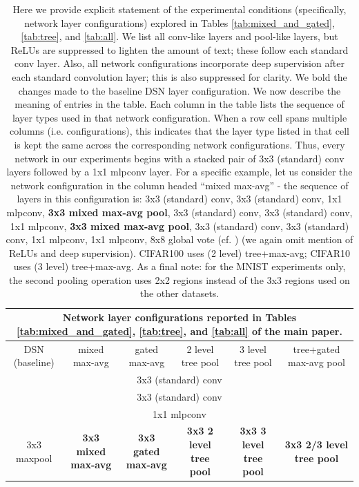 \documentclass[twoside]{article}
\begin{document}
\begin{table}[ht]
\vspace{-20mm}
\begin{centering}
{ \caption{\label{tab:network_configurations} Here we provide explicit statement of the experimental
conditions (specifically, network layer configurations) explored in
Tables \ref{tab:mixed_and_gated}, \ref{tab:tree}, and 
\ref{tab:all}. We list all conv-like layers and pool-like layers,
but ReLUs are suppressed to lighten the amount of text; these follow
each standard conv layer. Also, all network configurations incorporate
deep supervision after each standard convolution layer; this is also
suppressed for clarity.  We bold the changes made to the baseline
DSN layer configuration. We now describe the meaning of
entries in the table. Each column in the table lists the sequence
of layer types used in that network configuration. When a row cell
spans multiple columns (i.e. configurations), this indicates that
the layer type listed in that cell is kept the same across the corresponding
network configurations. Thus, every network in our experiments begins
with a stacked pair of 3x3 (standard) conv layers followed by a 1x1
mlpconv layer. For a specific example, let us consider the network
configuration in the column headed ``mixed max-avg'' - the sequence
of layers in this configuration is: 3x3 (standard) conv, 3x3 (standard)
conv, 1x1 mlpconv, \textbf{3x3 mixed max-avg pool},
3x3 (standard) conv, 3x3 (standard) conv, 1x1 mlpconv, \textbf{3x3
mixed max-avg pool}, 3x3 (standard) conv, 3x3 (standard)
conv, 1x1 mlpconv, 1x1 mlpconv, 8x8 global vote (cf. \cite{lin2013network}) (we again 
omit mention of ReLUs and deep supervision). CIFAR100 uses (2 level) tree+max-avg; CIFAR10 uses (3 level) 
tree+max-avg. As a final note: for the MNIST experiments only, the second pooling operation 
uses 2x2 regions instead of the 3x3 regions used on the other datasets.}
}
{\scriptsize
\begin{tabular}{c|c|c|c|c|c}
\hline 
\multicolumn{6}{c}{Network layer configurations reported in Tables \ref{tab:mixed_and_gated}, \ref{tab:tree}, and 
\ref{tab:all} of the main paper.}\tabularnewline
\hline 
DSN (baseline) & mixed max-avg & gated max-avg & 2 level tree pool & 3 level tree pool & tree+gated max-avg pool \tabularnewline 
\hline 
\hline 
\multicolumn{6}{c}{3x3 (standard) conv }\tabularnewline
\hline 
\multicolumn{6}{c}{3x3 (standard) conv }\tabularnewline
\hline 
\multicolumn{6}{c}{1x1 mlpconv}\tabularnewline
\hline 
\multirow{1}{*}{3x3 maxpool} & \textbf{{3x3 mixed max-avg}} & \textbf{{3x3 gated max-avg}} & \textbf{{3x3 2 level tree pool}} & \textbf{{3x3 3 level tree pool}} & \textbf{{3x3 2/3 level tree pool}}\tabularnewline

\end{tabular}}
\end{centering}
\end{table}
\end{document}
